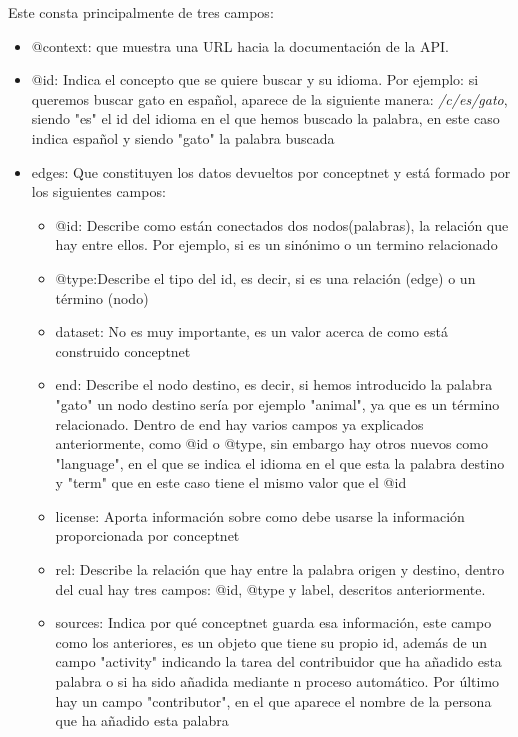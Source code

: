 Este consta principalmente de tres campos:
\begin{itemize}
	\item @context: que muestra una URL hacia la documentación de la API.
	\item @id: Indica el concepto que se quiere buscar y su idioma. Por ejemplo: si queremos buscar gato en español, aparece de la siguiente manera: \textit{/c/es/gato}, siendo "es" el id del idioma en el que hemos buscado la palabra, en este caso indica español y siendo "gato" la palabra buscada
	\item edges: Que constituyen los datos devueltos por conceptnet y está formado por los siguientes campos:
	\begin{itemize}
		\item @id: Describe como están conectados dos nodos(palabras), la relación que hay entre ellos. Por ejemplo, si es un sinónimo o un termino relacionado
		\item @type:Describe el tipo del id, es decir, si es una relación (edge) o un término (nodo)
		\item dataset: No es muy importante, es un valor acerca de como está construido conceptnet
		\item end: Describe el nodo destino, es decir, si hemos introducido la palabra "gato" un nodo destino sería por ejemplo "animal", ya que es un término relacionado. Dentro de end hay varios campos ya explicados anteriormente, como @id o @type, sin embargo hay otros nuevos como "language", en el que se indica el idioma en el que esta la palabra destino y "term" que en este caso tiene el mismo valor que el @id
		\item license: Aporta información sobre como debe usarse la información proporcionada por conceptnet
		\item rel: Describe la relación que hay entre la palabra origen y destino, dentro del cual hay tres campos: @id, @type y label, descritos anteriormente.
		\item sources: Indica por qué conceptnet guarda esa información, este campo como los anteriores, es un objeto que tiene su propio id, además de un campo "activity" indicando la tarea del contribuidor que ha añadido esta palabra o si ha sido añadida mediante n proceso automático. Por último hay un campo "contributor", en el que aparece el nombre de la persona que ha añadido esta palabra
	\end{itemize}
	
\end{itemize}

